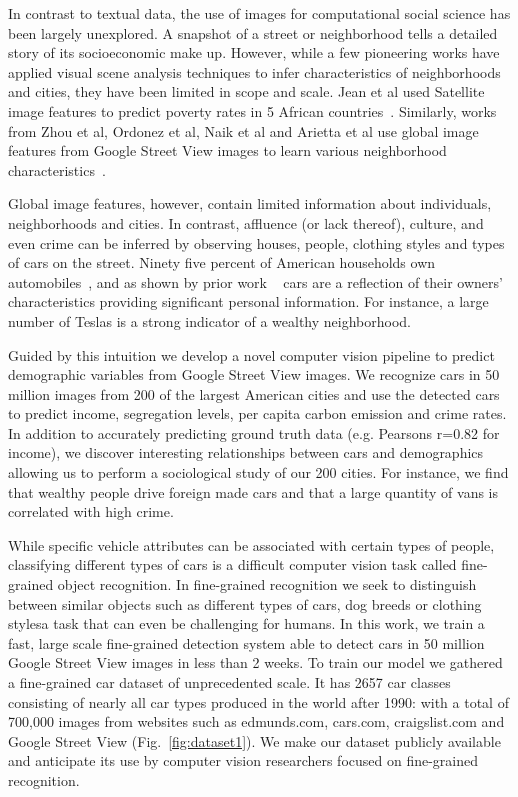 \documentclass[letterpaper]{article}
\begin{document}
In contrast to textual data, the use of images for computational social science has been largely unexplored. A snapshot of a street or neighborhood tells a detailed story of its socioeconomic make up. However, while a few pioneering works have applied visual scene analysis techniques to infer characteristics of neighborhoods and cities, they have been limited in scope and scale. Jean et al used Satellite image features to predict poverty rates in 5 African countries~\cite{neal}. Similarly, works from Zhou et al, Ordonez et al, Naik et al and Arietta et al use global image features from Google Street View images to learn various neighborhood characteristics~\cite{antonio,tamara,mit_cvpr,alyosha}.

Global image features, however, contain limited information about individuals, neighborhoods and cities. In contrast, affluence (or lack thereof), culture, and even crime can be inferred by observing houses, people, clothing styles and types of cars on the street. Ninety five percent of American households own automobiles~\cite{car_stats}, and as shown by prior work ~\cite{car_personality} cars are a reflection of their owners' characteristics providing significant personal information. For instance, a large number of Teslas is a strong indicator of a wealthy neighborhood.

Guided by this intuition we develop a novel computer vision pipeline to predict demographic variables from Google Street View images. We recognize cars in 50 million images from 200 of the largest American cities and use the detected cars to predict  income, segregation levels, per capita carbon emission and crime rates. In addition to accurately predicting ground truth data (e.g. Pearsons r=0.82 for income), we discover interesting relationships between cars and demographics allowing us to perform a sociological study of our 200 cities. For instance, we find that wealthy people drive foreign made cars and that a large quantity of vans is correlated with high crime.

While specific vehicle attributes can be associated with certain types of people, classifying different types of cars is a difficult computer vision task called fine-grained object recognition. In fine-grained recognition we seek to distinguish between similar objects such as different types of cars, dog breeds or clothing styles\textemdash a task that can even be challenging for humans. In this work, we train a fast, large scale fine-grained detection system able to detect cars in 50 million Google Street View images in less than 2 weeks. To train our model we gathered a fine-grained car dataset of unprecedented scale. It has 2657 car classes consisting of nearly all car types produced in the world after 1990: with a total of 700,000 images from websites such as edmunds.com, cars.com, craigslist.com and Google Street View (Fig.~\ref{fig:dataset1}). We make our dataset publicly available and anticipate its use by computer vision researchers focused on fine-grained recognition. 
\end{document}

